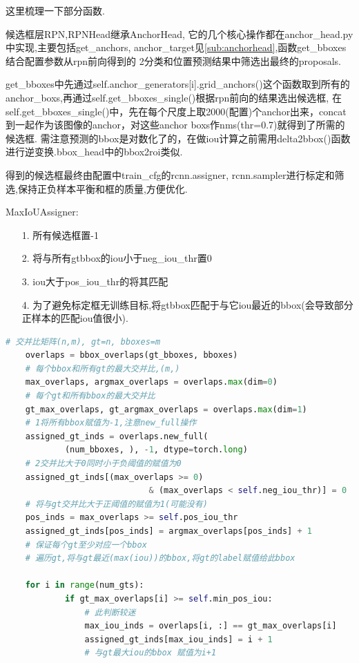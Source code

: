 \documentclass[UTF8]{ctexart}
\begin{document}
这里梳理一下部分函数.

候选框层RPN,RPNHead继承AnchorHead, 它的几个核心操作都在anchor\_head.py中实现,主要包括get\_anchors, anchor\_target见\ref{sub:anchorhead},函数get\_bboxes结合配置参数从rpn前向得到的
2分类和位置预测结果中筛选出最终的proposals.

get\_bboxes中先通过self.anchor\_generators[i].grid\_anchors()这个函数取到所有的anchor\_boxs,再通过self.get\_bboxes\_single()根据rpn前向的结果选出候选框,
在self.get\_bboxes\_single()中，先在每个尺度上取2000(配置)个anchor出来，concat到一起作为该图像的anchor，对这些anchor boxs作nms(thr=0.7)就得到了所需的候选框.
需注意预测的bbox是对数化了的，在做iou计算之前需用delta2bbox()函数进行逆变换.bbox\_head中的bbox2roi类似.

得到的候选框最终由配置中train\_cfg的rcnn.assigner, rcnn.sampler进行标定和筛选,保持正负样本平衡和框的质量,方便优化.

MaxIoUAssigner:
\label{sub:MaxIoUAssigner}
\begin{adjustwidth}{1cm}{0cm}
\begin{itemize}
	\item[1.] 所有候选框置-1
	\item[2.] 将与所有gtbbox的iou小于neg\_iou\_thr置0
	\item[3.] iou大于pos\_iou\_thr的将其匹配
	\item[4.] 为了避免标定框无训练目标,将gtbbox匹配于与它iou最近的bbox(会导致部分正样本的匹配iou值很小).
\end{itemize}
\end{adjustwidth}


\lstset{style=mystyle}
\begin{lstlisting}[language=Python]
	# 交并比矩阵(n,m), gt=n, bboxes=m
	overlaps = bbox_overlaps(gt_bboxes, bboxes)
	# 每个bbox和所有gt的最大交并比,(m,)
	max_overlaps, argmax_overlaps = overlaps.max(dim=0)
	# 每个gt和所有bbox的最大交并比
	gt_max_overlaps, gt_argmax_overlaps = overlaps.max(dim=1)
	# 1将所有bbox赋值为-1,注意new_full操作
	assigned_gt_inds = overlaps.new_full(
			(num_bboxes, ), -1, dtype=torch.long)
	# 2交并比大于0同时小于负阈值的赋值为0
	assigned_gt_inds[(max_overlaps >= 0)
							 & (max_overlaps < self.neg_iou_thr)] = 0
	# 将与gt交并比大于正阈值的赋值为1(可能没有)
	pos_inds = max_overlaps >= self.pos_iou_thr
	assigned_gt_inds[pos_inds] = argmax_overlaps[pos_inds] + 1
	# 保证每个gt至少对应一个bbox
	# 遍历gt,将与gt最近(max(iou))的bbox,将gt的label赋值给此bbox

	for i in range(num_gts):
			if gt_max_overlaps[i] >= self.min_pos_iou:
				# 此判断较迷
				max_iou_inds = overlaps[i, :] == gt_max_overlaps[i]
				assigned_gt_inds[max_iou_inds] = i + 1 
				# 与gt最大iou的bbox 赋值为i+1

\end{lstlisting}
\end{document}
